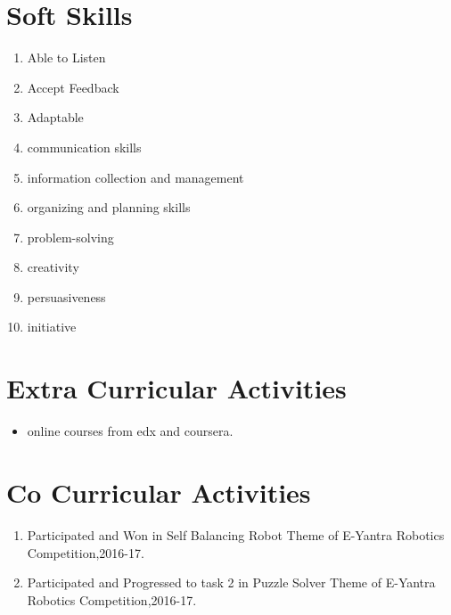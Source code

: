 \documentclass[margin,line]{res}
\begin{document}
\begin{resume}
\section{\sc Soft Skills}


\begin{enumerate}
	\item Able to Listen
	\item Accept Feedback
	\item Adaptable
	\item communication skills
	\item information collection and management
	\item organizing and planning skills
	\item problem-solving
	\item creativity
	\item persuasiveness
	\item initiative		    
\end{enumerate}

\section{\sc Extra Curricular Activities}
\begin{itemize}
	\item online courses from edx and coursera.
\end{itemize}

\section{\sc Co Curricular Activities}
\begin{enumerate}
	\item Participated and Won in Self Balancing Robot Theme of E-Yantra Robotics Competition,2016-17.
	\item Participated and Progressed to task 2 in Puzzle Solver Theme of E-Yantra Robotics Competition,2016-17.	    
\end{enumerate}


\end{resume}
\end{document}
